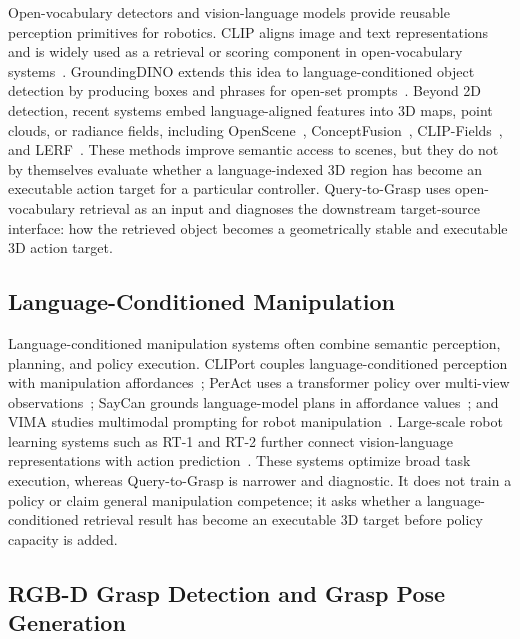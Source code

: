 \documentclass[preprint,12pt]{elsarticle}
\begin{document}
Open-vocabulary detectors and vision-language models provide reusable
perception primitives for robotics. CLIP aligns image and text representations
and is widely used as a retrieval or scoring component in open-vocabulary
systems~\cite{radford2021learning}. GroundingDINO extends this idea to
language-conditioned object detection by producing boxes and phrases for
open-set prompts~\cite{liu2023groundingdino}. Beyond 2D detection, recent
systems embed language-aligned features into 3D maps, point clouds, or radiance
fields, including OpenScene~\cite{peng2023openscene},
ConceptFusion~\cite{jatavallabhula2023conceptfusion},
CLIP-Fields~\cite{shafiullah2023clipfields}, and
LERF~\cite{kerr2023lerf}. These methods improve semantic access to scenes, but
they do not by themselves evaluate whether a language-indexed 3D region has
become an executable action target for a particular controller. Query-to-Grasp
uses open-vocabulary retrieval as an input and diagnoses the downstream
target-source interface: how the retrieved object becomes a geometrically
stable and executable 3D action target.

\subsection{Language-Conditioned Manipulation}

Language-conditioned manipulation systems often combine semantic perception,
planning, and policy execution. CLIPort couples language-conditioned perception
with manipulation affordances~\cite{shridhar2022cliport}; PerAct uses a
transformer policy over multi-view observations~\cite{shridhar2022peract};
SayCan grounds language-model plans in affordance values~\cite{ahn2022saycan};
and VIMA studies multimodal prompting for robot manipulation~\cite{jiang2023vima}.
Large-scale robot learning systems such as RT-1 and RT-2 further connect
vision-language representations with action prediction~\cite{brohan2022rt1,
brohan2023rt2}. These systems optimize broad task execution, whereas
Query-to-Grasp is narrower and diagnostic. It does not train a policy or claim
general manipulation competence; it asks whether a language-conditioned
retrieval result has become an executable 3D target before policy capacity is
added.

\subsection{RGB-D Grasp Detection and Grasp Pose Generation}
\end{document}
